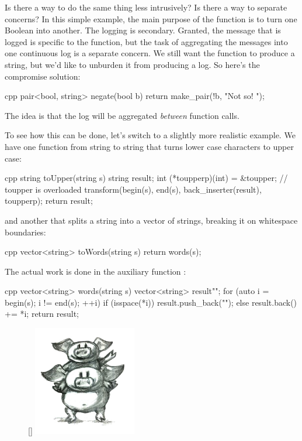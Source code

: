 Is there a way to do the same thing less intrusively? Is there a way to
separate concerns? In this simple example, the main purpose of the
function  is to turn one Boolean into another. The
logging is secondary. Granted, the message that is logged is specific to
the function, but the task of aggregating the messages into one
continuous log is a separate concern. We still want the function to
produce a string, but we'd like to unburden it from producing a log. So
here's the compromise solution:

\begin{snip}{cpp}
pair<bool, string> negate(bool b) {
    return make_pair(!b, "Not so! ");
}
\end{snip}
The idea is that the log will be aggregated \emph{between} function
calls.

To see how this can be done, let's switch to a slightly more realistic
example. We have one function from string to string that turns lower
case characters to upper case:

\begin{snip}{cpp}
string toUpper(string s) {
    string result;
    int (*toupperp)(int) = &toupper; // toupper is overloaded
    transform(begin(s), end(s), back_inserter(result), toupperp);
    return result;
}
\end{snip}
and another that splits a string into a vector of strings, breaking it
on whitespace boundaries:

\begin{snip}{cpp}
vector<string> toWords(string s) {
    return words(s);
}
\end{snip}
The actual work is done in the auxiliary function :

\begin{snip}{cpp}
vector<string> words(string s) {
    vector<string> result{""};
    for (auto i = begin(s); i != end(s); ++i)
    {
        if (isspace(*i))
            result.push_back(""); 
        else
            result.back() += *i;
    }
    return result;
}
\end{snip}

\begin{figure}
\raisebox{14pt}[\dimexpr{}\baselineskip\relax]{
\includegraphics[width=0.4\textwidth]{images/piggyback.jpg}}%
\end{figure}

